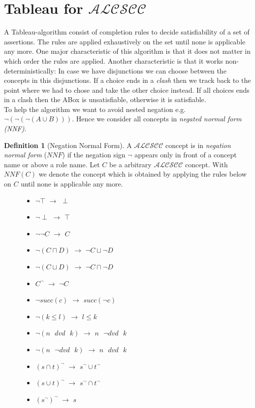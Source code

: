 \documentclass[a4paper,11pt]{scrartcl}
\theoremstyle{break}
\theoremstyle{definition}
\newtheorem{mydef}{Definition}
\begin{document}
\section{Tableau for $\mathcal{ALCSCC}$}
A Tableau-algorithm consist of completion rules to decide satisfiability of a set of assertions. The rules are applied exhaustively on the set until none is applicable any more. One major characteristic of this algorithm is that it does not matter in which order the rules are applied. Another characteristic is that it works non-deterministically: In case we have disjunctions we can choose between the concepts in this disjunctions. If a choice ends in a \textit{clash} then we track back to the point where we had to chose and take the other choice instead. If all choices ends in a clash then the ABox is unsatisfiable, otherwise it is satisfiable.\\
To help the algorithm we want to avoid nested negation e.g. $\neg(\neg(\neg(A\cup B)))$. Hence we consider all concepts in \textit{negated normal form (NNF)}.
\begin{mydef}[Negation Normal Form]
A $\mathcal{ALCSCC}$ concept is in \textit{negation normal form} ($NNF$) if the negation sign $\neg$ appears only in front of a concept name or above a role name. Let $C$ be a arbitrary $\mathcal{ALCSCC}$ concept. With $NNF(C)$ we denote the concept which is obtained by applying the rules below on $C$ until none is applicable any more.
\begin{figure}[H]
\begin{minipage}[t]{.5\textwidth}
\raggedright
\begin{itemize}
\item $\neg\top$ $\rightarrow$ $\perp$
\item $\neg\perp$ $\rightarrow$ $\top$
\item $\neg\neg C$ $\rightarrow$ $C$
\item $\neg(C\sqcap D)$ $\rightarrow$ $\neg C \sqcup \neg D$
\item $\neg(C\sqcup D)$ $\rightarrow$ $\neg C \sqcap \neg D$
\item $C^\neg$ $\rightarrow$ $\neg C$
\item $\neg succ(c)$ $\rightarrow$ $succ(\neg c)$
\end{itemize}
\end{minipage}%
\begin{minipage}[t]{.5\textwidth}
\raggedleft
\begin{itemize}
\item $\neg (k\leq l)$ $\rightarrow$ $l\leq k$
\item $\neg (n\text{ } dvd \text{ } k)$ $\rightarrow$ $n\text{ } \neg dvd \text{ } k$
\item $\neg (n\text{ } \neg dvd \text{ } k)$ $\rightarrow$ $n\text{ } dvd \text{ } k$
\item $(s\cap t)^\neg$ $\rightarrow$ $s^\neg \cup t^\neg$
\item $(s\cup t)^\neg$ $\rightarrow$ $s^\neg \cap t^\neg$
\item $(s^\neg)^\neg$ $\rightarrow$ $s$
\end{itemize}
\end{minipage}
\end{figure}
\end{mydef}
\end{document}

